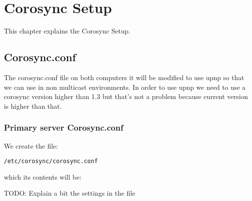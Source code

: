 

\chapter{Corosync Setup}
\label{chap:corosync-setup}
This chapter explains the Corosync Setup.

\section {Corosync.conf}

The corosync.conf file on both computers it will be modified to use upnp so that we can use in non multicast environments. In order to use upnp we need to use a corosync version higher than 1.3 but that's not a problem because current version is higher than that.

\subsection {Primary server Corosync.conf}

We create the file:
\begin{verbatim}
/etc/corosync/corosync.conf
\end{verbatim}
which its contents will be:

TODO: Explain a bit the settings in the file

